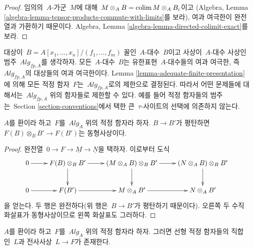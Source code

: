 \begin{proof}
임의의\  $A$-가군\  $M$에 대해\ 
$M \otimes_A B = \mathop{\mathrm{colim}}\nolimits M \otimes_A B_i$이고
(Algebra, Lemma
\ref{algebra-lemma-tensor-products-commute-with-limits}를 보라),
여과 여극한이 완전열과 가환하기 때문이다. Algebra, Lemma
\ref{algebra-lemma-directed-colimit-exact}를 보라.
\end{proof}

\begin{remark}
\label{remark-settheoretic}
대상이\ 
$B = A[x_1, \ldots, x_n]/(f_1, \ldots, f_m)$ 꼴인\  $A$-대수\ 
$B$이고 사상이\  $A$-대수 사상인 범주\ 
$\textit{Alg}_{fp, A}$를 생각하자. 모든\  $A$-대수\  $B$는 유한표현\ 
$A$-대수들의 여과 여극한, 즉\  $\textit{Alg}_{fp, A}$의 대상들의
여과 여극한이다. Lemma
\ref{lemma-adequate-finite-presentation}에 의해 모든 적정 함자\ 
$F$는\  $\textit{Alg}_{fp, A}$로의 제한으로 결정된다. 따라서 어떤
문제들에 대해서는\  $\textit{Alg}_{fp, A}$ 위의 함자들로 제한할
수 있다. 예를 들어 적정 함자들의 범주는\  Section
\ref{section-conventions}에서 택한 큰\  $\tau$-사이트의 선택에
의존하지 않는다.
\end{remark}

\begin{lemma}
\label{lemma-adequate-flat}
$A$를 환이라 하고\  $F$를\  $\textit{Alg}_A$ 위의 적정 함자라 하자.
$B \to B'$가 평탄하면\ 
$F(B) \otimes_B B' \to F(B')$는 동형사상이다.
\end{lemma}

\begin{proof}
완전열\  $0 \to F \to \underline{M} \to \underline{N}$을 택하자.
이로부터 도식
$$
\xymatrix{
0 \ar[r] & F(B) \otimes_B B' \ar[r] \ar[d] &
(M \otimes_A B)\otimes_B B' \ar[r] \ar[d] &
(N \otimes_A B)\otimes_B B' \ar[d] \\
0 \ar[r] & F(B') \ar[r] &
M \otimes_A B' \ar[r] &
N \otimes_A B'
}
$$
을 얻는다. 두 행은 완전하다(위 행은\  $B \to B'$가 평탄하기
때문이다). 오른쪽 두 수직 화살표가 동형사상이므로 왼쪽 화살표도
그러하다.
\end{proof}

\begin{lemma}
\label{lemma-adequate-surjection-from-linear}
$A$를 환이라 하고\  $F$를\  $\textit{Alg}_A$ 위의 적정 함자라 하자.
그러면 선형 적정 함자들의 직합인\  $L$과 전사사상\  $L \to F$가
존재한다.
\end{lemma}

